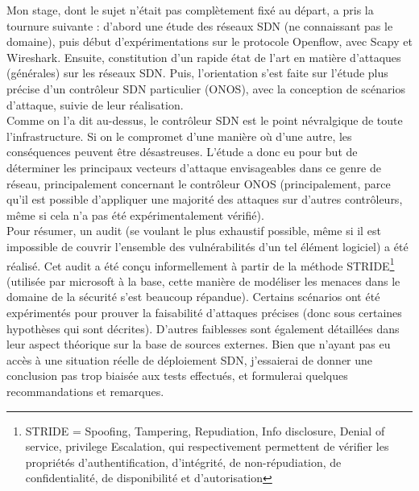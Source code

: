 Mon stage, dont le sujet n'était pas complètement fixé au départ, a pris la tournure suivante : d'abord une étude des réseaux SDN (ne connaissant pas le domaine), puis début d'expérimentations sur le protocole Openflow, avec Scapy et Wireshark. Ensuite, constitution d'un rapide état de l'art en matière d'attaques (générales) sur les réseaux SDN. Puis, l'orientation s'est faite sur l'étude plus précise d'un contrôleur SDN particulier (ONOS), avec la conception de scénarios d'attaque, suivie de leur réalisation.\\
Comme on l'a dit au-dessus, le contrôleur SDN est le point névralgique de toute l'infrastructure. Si on le compromet d'une manière où d'une autre, les conséquences peuvent être désastreuses. L'étude a donc eu pour but de déterminer les principaux vecteurs d'attaque envisageables dans ce genre de réseau, principalement concernant le contrôleur ONOS (principalement, parce qu'il  est possible d'appliquer une majorité des attaques sur d'autres contrôleurs, même si cela n'a pas été expérimentalement vérifié).\\
Pour résumer, un audit (se voulant le plus exhaustif possible, même si il est impossible de couvrir l'ensemble des vulnérabilités d'un tel élément logiciel) a été réalisé. Cet audit a été conçu informellement à partir de la méthode STRIDE\footnote{STRIDE = Spoofing, Tampering, Repudiation, Info disclosure, Denial of service, privilege Escalation, qui respectivement permettent de vérifier les propriétés d'authentification, d'intégrité, de non-répudiation, de confidentialité, de disponibilité et d'autorisation} (utilisée par microsoft à la base, cette manière de modéliser les menaces dans le domaine de la sécurité s’est beaucoup répandue). Certains scénarios ont été expérimentés pour prouver la faisabilité d'attaques précises (donc sous certaines hypothèses qui sont décrites). D'autres faiblesses sont également détaillées dans leur aspect théorique sur la base de sources externes. Bien que n'ayant pas eu accès à une situation réelle de déploiement SDN, j'essaierai de donner une conclusion pas trop biaisée aux tests effectués, et formulerai quelques recommandations et remarques.
